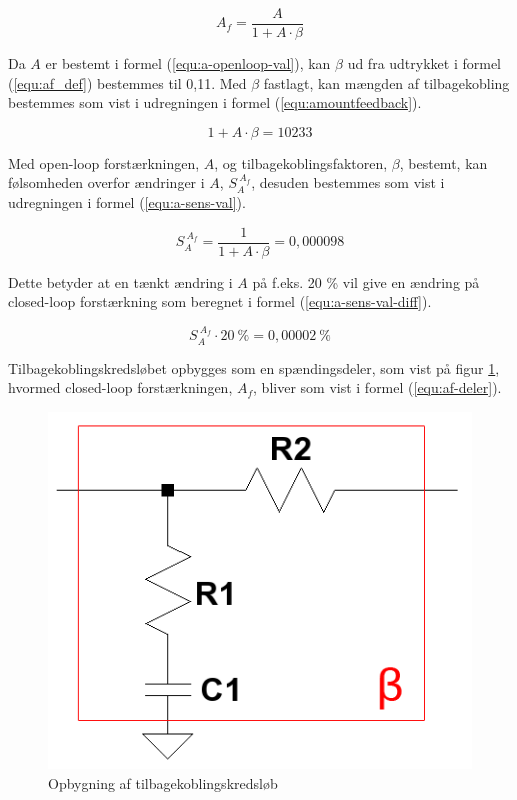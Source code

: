 \begin{equation}
\label{equ:af_def}
A_f = \frac{A}{1 + A \cdot \beta}
\end{equation}

Da $A$ er bestemt i formel (\ref{equ:a-openloop-val}), kan $\beta$ ud fra udtrykket i formel (\ref{equ:af_def}) bestemmes til 0,11. Med $\beta$ fastlagt, kan mængden af tilbagekobling bestemmes som vist i udregningen i formel (\ref{equ:amountfeedback}).

\begin{equation}
\label{equ:amountfeedback}
1 + A \cdot \beta = 10233
\end{equation}

Med open-loop forstærkningen, $A$, og tilbagekoblingsfaktoren, $\beta$, bestemt, kan følsomheden overfor ændringer i $A$, $S_A^{~A_f}$, desuden bestemmes som vist i udregningen i formel (\ref{equ:a-sens-val}).

\begin{equation}
\label{equ:a-sens-val}
S_A^{~A_f} = \frac{1}{1 + A \cdot \beta} = 0,000098
\end{equation}

Dette betyder at en tænkt ændring i $A$ på f.eks. 20 \% vil give en ændring på closed-loop forstærkning som beregnet i formel (\ref{equ:a-sens-val-diff}).

\begin{equation}
\label{equ:a-sens-val-diff}
S_A^{~A_f} \cdot 20~\% = 0,00002~\%
\end{equation}

Tilbagekoblingskredsløbet opbygges som en spændingsdeler, som vist på figur \ref{fig:beta-clean}, hvormed closed-loop forstærkningen, $A_f$, bliver som vist i formel (\ref{equ:af-deler}).

\begin{figure}[h]
\centering
\includegraphics[scale=0.3]{teknisk/effektforstaerker/beta-clean.png}
\caption{Opbygning af tilbagekoblingskredsløb}
\label{fig:beta-clean}
\end{figure} 

